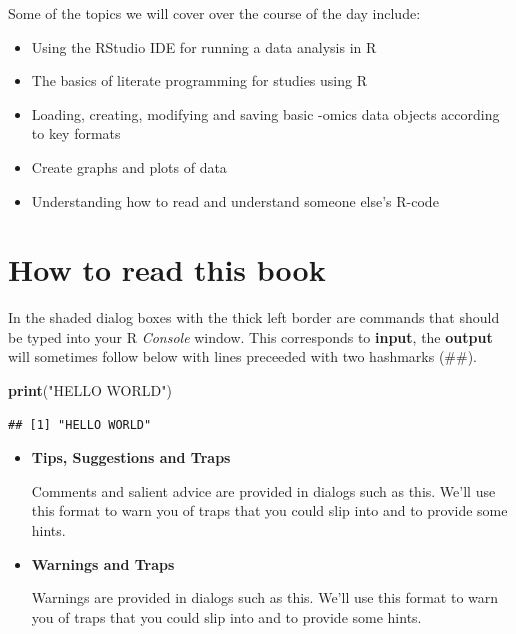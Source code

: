 \documentclass[a4paper]{book}
\newenvironment{Shaded}{\begin{snugshade}}{\end{snugshade}}
\newcommand{\KeywordTok}[1]{\textcolor[rgb]{0.13,0.29,0.53}{\textbf{{#1}}}}
\newcommand{\StringTok}[1]{\textcolor[rgb]{0.31,0.60,0.02}{{#1}}}
\newcommand{\NormalTok}[1]{{#1}}
\providecommand{\tightlist}{%
  \setlength{\itemsep}{0pt}\setlength{\parskip}{0pt}}
\renewenvironment{Shaded}
{\vspace{1.5em}\begin{leftbar}\begin{snugshade}}
{\end{snugshade}\end{leftbar}\vspace{3pt}}
\newenvironment{rmdblock}[1]
  {\vspace{1.5em}\begin{shaded*}
  \begin{itemize}
  \renewcommand{\labelitemi}{
    \raisebox{-.7\height}[0pt][0pt]{
      {\setkeys{Gin}{width=3em,keepaspectratio}\texttt{[image: images/\#1]}}
    }
  }
  \item
  }
  {
  \end{itemize}
  \end{shaded*}
  }
\newenvironment{rmdcaution}
  {\begin{rmdblock}{caution}}
  {\end{rmdblock}}
\newenvironment{rmdtip}
  {\begin{rmdblock}{tip}}
  {\end{rmdblock}}
\begin{document}
Some of the topics we will cover over the course of the day include:

\begin{itemize}
\tightlist
\item
  Using the RStudio IDE for running a data analysis in R
\item
  The basics of literate programming for studies using R
\item
  Loading, creating, modifying and saving basic -omics data objects
  according to key formats
\item
  Create graphs and plots of data
\item
  Understanding how to read and understand someone else's R-code
\end{itemize}

\section{How to read this book}\label{how-to-read-this-book}

In the shaded dialog boxes with the thick left border are commands that
should be typed into your R \emph{Console} window. This corresponds to
\textbf{input}, the \textbf{output} will sometimes follow below with
lines preceeded with two hashmarks (\#\#).

\begin{Shaded}
\begin{Highlighting}[]
\KeywordTok{print}\NormalTok{(}\StringTok{"HELLO WORLD"}\NormalTok{)}
\end{Highlighting}
\end{Shaded}

\begin{verbatim}
## [1] "HELLO WORLD"
\end{verbatim}

\begin{rmdtip}
\textbf{Tips, Suggestions and Traps}

Comments and salient advice are provided in dialogs such as this. We'll
use this format to warn you of traps that you could slip into and to
provide some hints.
\end{rmdtip}

\begin{rmdcaution}
\textbf{Warnings and Traps}

Warnings are provided in dialogs such as this. We'll use this format to
warn you of traps that you could slip into and to provide some hints.
\end{rmdcaution}
\end{document}
